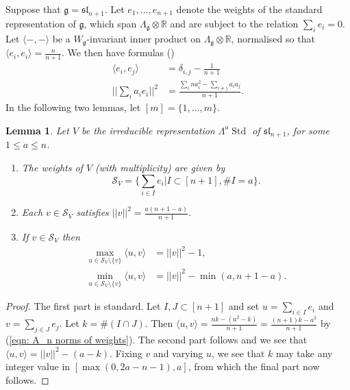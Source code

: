 \documentclass{amsart}
\newtheorem{lemma}[theorem]{Lemma}
\theoremstyle{definition}
\numberwithin{equation}{section} %
\newcommand{\sllie}{\mathfrak{sl}}
\newcommand{\Std}{\operatorname{Std}}
\newcommand{\bb}[1]{\mathbb{#1}}
\newcommand{\mf}[1]{\mathfrak{#1}}
\begin{document}
Suppose that $\mf{g} = \sllie_{n+1}$.
Let $e_1,\ldots,e_{n+1}$ denote the weights of the standard representation of $\mf{g}$, which span $\Lambda_{\mf{g}} \otimes \bb{R}$ and are subject to the relation $\sum_{i} e_i = 0$. 
Let $\langle-,-\rangle$ be a $W_{\mf{g}}$-invariant inner product on $\Lambda_{\mf{g}} \otimes \bb{R}$, normalised so that $\langle e_i, e_i \rangle = \frac{n}{n+1}$.
We then have formulas (\cite[\S 2.7]{hui2013monodromy})
\begin{align} 
\langle e_i, e_j \rangle &= \delta_{i,j} - \frac{1}{n+1} \label{eqn: A_n inner products of weights} \\
||\sum_i a_i e_i ||^2 &= \frac{\sum_i n a_i^2 -  \sum_{i \neq j} a_i a_j}{n+1}.  \label{eqn: A_n norms of weights}  
\end{align}
In the following two lemmas, let $[m] = \{1,\ldots,m\}$.

\begin{lemma} \label{lemma: alternating power inner products}
Let $V$ be the irreducible representation $\Lambda^a \Std$ of $\sllie_{n+1}$, for some $1 \leq a \leq n$.
\begin{enumerate}
\item The weights of $V$ (with multiplicity) are given by
\[ \mathcal{S}_V = \{\sum_{i \in I} e_i | I \subset [n+1], \# I = a \}.\]
\item Each $v \in \mathcal{S}_V$ satisfies $||v||^2 = \frac{a(n+1-a)}{n+1}$.
\item If $v \in \mathcal{S}_V$ then
\begin{align*}
\max_{u \in \mathcal{S}_V \setminus \{v\}} \langle u, v \rangle &= ||v||^2 - 1,    \\
\min_{u \in \mathcal{S}_V \setminus \{v\}} \langle u, v \rangle &= ||v||^2 - \min(a,n+1-a).
\end{align*}
\end{enumerate}
\end{lemma}
\begin{proof}
The first part is standard.
Let $I,J \subset [n+1]$ and set $u = \sum_{i \in I} e_i$ and $v = \sum_{j \in J} e_j$.
Let $k = \#( I \cap J)$.
Then $\langle u, v \rangle = \frac{n k - (a^2 - k)}{n+1} = \frac{(n+1)k - a^2}{n+1}$ by (\ref{eqn: A_n norms of weights}).
The second part follows and we see that $\langle u , v \rangle = ||v||^2 - (a-k)$.
Fixing $v$ and varying $u$, we see that $k$ may take any integer value in $[\max(0,2a-n-1),a]$, from which the final part now follows.
\end{proof}
\end{document}
